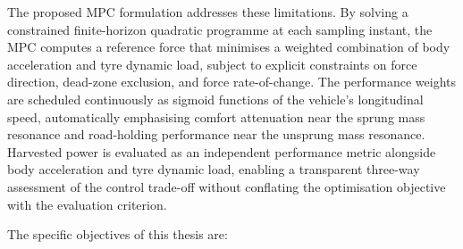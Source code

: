 The proposed MPC formulation addresses these limitations. By solving a
constrained finite-horizon quadratic programme at each sampling instant,
the MPC computes a reference force that minimises a weighted combination
of body acceleration and tyre dynamic load, subject to explicit
constraints on force direction, dead-zone exclusion, and force rate-of-change. 
The performance weights are scheduled continuously as sigmoid functions of the 
vehicle's longitudinal speed, automatically emphasising comfort attenuation near the
sprung mass resonance and road-holding performance near the unsprung
mass resonance. Harvested power is evaluated as an independent
performance metric alongside body acceleration and tyre dynamic load,
enabling a transparent three-way assessment of the control trade-off
without conflating the optimisation objective with the evaluation
criterion.

The specific objectives of this thesis are:

